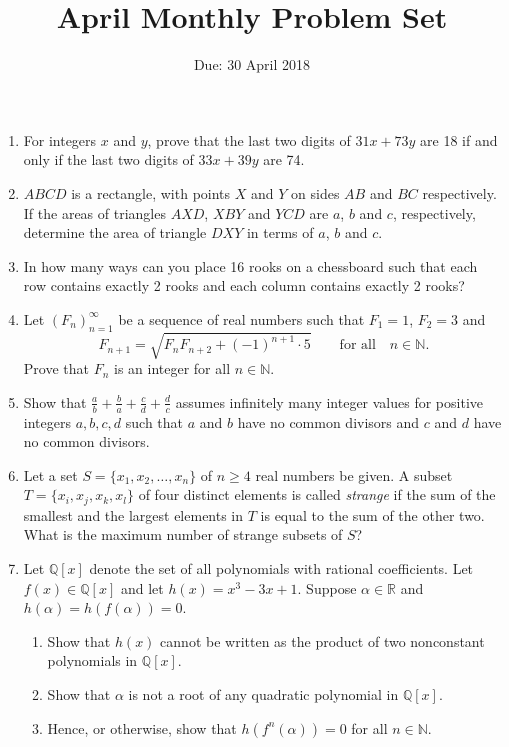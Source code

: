 \documentclass[12pt]{article}
\title{April Monthly Problem Set}
\author{Due: 30 April 2018}
\date{}
\begin{document}
 \vspace{-12pt} \maketitle \pagestyle{empty}

\begin{enumerate}

\item %
For integers $x$ and $y$, prove that the last two digits of $31x+73y$ are 18 if and only if the last two digits of $33x+39y$ are 74.


\item %
$ABCD$ is a rectangle, with points $X$ and $Y$ on sides $AB$ and $BC$ respectively. If the areas of triangles $AXD$, $XBY$ and $YCD$ are $a$, $b$ and $c$, respectively, determine the area of triangle $DXY$ in terms of $a$, $b$ and $c$.


\item %
In how many ways can you place 16 rooks on a chessboard such that each row contains exactly 2 rooks and each column contains exactly 2 rooks?


\item %
Let $(F_n)_{n=1}^\infty$ be a sequence of real numbers such that $F_1 = 1$, $F_2 = 3$ and \[F_{n+1} = \sqrt{F_{n}F_{n+2} +(-1)^{n+1} \cdot 5} \qquad \textrm{for all}\quad n\in\mathbb{N}.\] Prove that $F_n$ is an integer for all $n\in\mathbb{N}$.


\item %
Show that $\displaystyle \frac{a}{b} +\frac{b}{a} +\frac{c}{d} +\frac{d}{c}$ assumes infinitely many integer values for positive integers $a,b,c,d$ such that $a$ and $b$ have no common divisors and $c$ and $d$ have no common divisors.


\item %
Let a set $S = \{x_1,x_2,\dotsc,x_n\}$ of $n \geq 4$ real numbers be given. A subset $T = \{x_i,x_j,x_k,x_l\}$ of four distinct elements is called \emph{strange} if the sum of the smallest and the largest elements in $T$ is equal to the sum of the other two. What is the maximum number of strange subsets of $S$?


\item %
Let $\mathbb{Q}[x]$ denote the set of all polynomials with rational coefficients. Let $f(x) \in \mathbb{Q}[x]$ and let $h(x) = x^3-3x+1$. Suppose $\alpha \in \mathbb{R}$ and $h(\alpha) =h(f(\alpha)) =0$.
\begin{enumerate}[label=(\alph*)]
\item Show that $h(x)$ cannot be written as the product of two nonconstant polynomials in $\mathbb{Q}[x]$.
\item Show that $\alpha$ is not a root of any quadratic polynomial in $\mathbb{Q}[x]$.
\item Hence, or otherwise, show that $h(f^n(\alpha)) = 0$ for all $n \in \mathbb{N}$.
\end{enumerate}



\end{enumerate}
\end{document}
